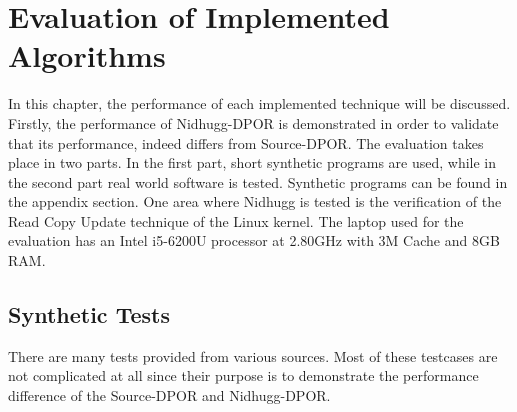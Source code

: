 \chapter{Evaluation of Implemented Algorithms}
\label{Chapter 4}

In this chapter, the performance of each implemented technique will be discussed. Firstly, the performance of
Nidhugg-DPOR is demonstrated in order to validate that its performance, indeed differs from Source-DPOR. The evaluation
takes place in two parts. In the first part, short synthetic programs are used, while in the second part real world
software is tested. Synthetic programs can be found in the appendix section. One area where Nidhugg is tested is the
verification of the Read Copy Update technique of the Linux kernel. The laptop used for the evaluation has an
Intel i5-6200U processor at 2.80GHz with 3M Cache and 8GB RAM.


\section{Synthetic Tests}
There are many tests provided from various sources. Most of these testcases are not complicated at all since their
purpose is to demonstrate the performance difference of the Source-DPOR and Nidhugg-DPOR.

